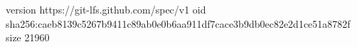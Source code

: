 version https://git-lfs.github.com/spec/v1
oid sha256:caeb8139c5267b9411c89ab0e0b6aa911df7cace3b9db0ec82e2d1ce51a8782f
size 21960
